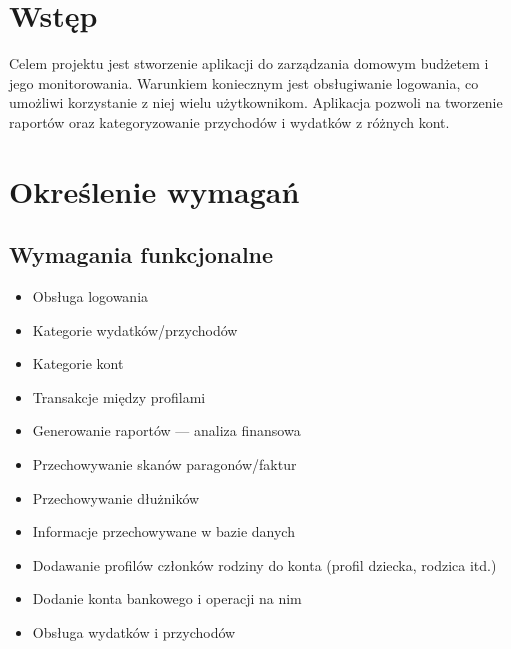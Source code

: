 \documentclass[12pt,a4paper,oneside]{article}
\begin{document}
\thispagestyle{empty}
\tableofcontents
\newpage

\section{Wstęp}
Celem projektu jest stworzenie aplikacji do zarządzania domowym budżetem i jego
monitorowania. Warunkiem koniecznym jest obsługiwanie logowania, co umożliwi
korzystanie z niej wielu użytkownikom. Aplikacja pozwoli na tworzenie raportów
oraz kategoryzowanie przychodów i wydatków z różnych kont.

\section{Określenie wymagań}
\subsection{Wymagania funkcjonalne}
\begin{itemize}
    \item Obsługa logowania
    \item Kategorie wydatków/przychodów
    \item Kategorie kont
    \item Transakcje między profilami
    \item Generowanie raportów — analiza finansowa
    \item Przechowywanie skanów paragonów/faktur
    \item Przechowywanie dłużników
    \item Informacje przechowywane w bazie danych
    \item Dodawanie profilów członków rodziny do konta (profil dziecka, rodzica
          itd.)
    \item Dodanie konta bankowego i operacji na nim
    \item Obsługa wydatków i przychodów
\end{itemize}
\end{document}
